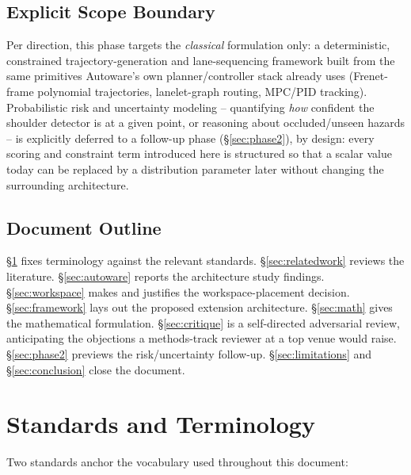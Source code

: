\documentclass[11pt]{article}
\begin{document}
\subsection{Explicit Scope Boundary}
Per direction, this phase targets the \emph{classical} formulation only: a deterministic,
constrained trajectory-generation and lane-sequencing framework built from the same primitives
Autoware's own planner/controller stack already uses (Frenet-frame polynomial trajectories,
lanelet-graph routing, MPC/PID tracking). Probabilistic risk and uncertainty modeling --
quantifying \emph{how} confident the shoulder detector is at a given point, or reasoning about
occluded/unseen hazards -- is explicitly deferred to a follow-up phase (\S\ref{sec:phase2}), by
design: every scoring and constraint term introduced here is structured so that a scalar value
today can be replaced by a distribution parameter later without changing the surrounding
architecture.

\subsection{Document Outline}
\S\ref{sec:standards} fixes terminology against the relevant standards.
\S\ref{sec:relatedwork} reviews the literature.
\S\ref{sec:autoware} reports the architecture study findings.
\S\ref{sec:workspace} makes and justifies the workspace-placement decision.
\S\ref{sec:framework} lays out the proposed extension architecture.
\S\ref{sec:math} gives the mathematical formulation.
\S\ref{sec:critique} is a self-directed adversarial review, anticipating the objections a
methods-track reviewer at a top venue would raise.
\S\ref{sec:phase2} previews the risk/uncertainty follow-up.
\S\ref{sec:limitations} and \S\ref{sec:conclusion} close the document.

\section{Standards and Terminology}
\label{sec:standards}

Two standards anchor the vocabulary used throughout this document:
\end{document}
